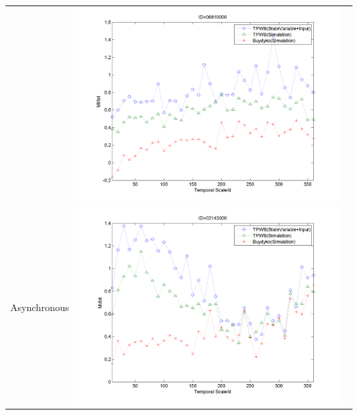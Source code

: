 \documentclass[11pt]{article}
\begin{document}
\begin{table}[H]
{\begin{tabular}{ccc}
&\begin{minipage}{.6\textwidth}\includegraphics[width=\linewidth]{resultgraph/06810000MI.png}\end{minipage}
\\
Asynchronous
&\begin{minipage}{.6\textwidth}\includegraphics[width=\linewidth]{resultgraph/02143000MI.png}\end{minipage}
 

\end{tabular}}
\end{table}
\end{document}
